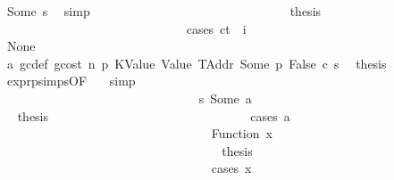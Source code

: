 \begin{isabellebody}
\ Some\ s{}\ \isamarkupfalse%
\ simp\isanewline
\ \ \ \ \ \ \ \ \ \ \ \ \ \ \ \ \ \ \ \ \ \ \ \ \ \ \ \ \isamarkupfalse%
\ \isamarkupfalse%
\ {\isacharquery}{\kern0pt}thesis\isanewline
\ \ \ \ \ \ \ \ \ \ \ \ \ \ \ \ \ \ \ \ \ \ \ \ \ \ \ \ \isamarkupfalse%
\ {\isacharparenleft}{\kern0pt}cases\ {\isachardoublequoteopen}ct\ {\isachardollar}{\kern0pt}{\isachardollar}{\kern0pt}\ i{\isachardoublequoteclose}{\isacharparenright}{\kern0pt}\isanewline
\ \ \ \ \ \ \ \ \ \ \ \ \ \ \ \ \ \ \ \ \ \ \ \ \ \ \ \ \ \ \isamarkupfalse%
\ None\isanewline
\ \ \ \ \ \ \ \ \ \ \ \ \ \ \ \ \ \ \ \ \ \ \ \ \ \ \ \ \ \ \isamarkupfalse%
\ a{}\ gc{\isacharunderscore}{\kern0pt}def\ gcost\ n\ p{}\ KValue\ Value\ TAddr\ Some\ p{}\ False\ c\ s{}\ \isamarkupfalse%
\ {\isacharquery}{\kern0pt}thesis\ \isamarkupfalse%
\ expr{\isachardot}{\kern0pt}psimps{\isacharparenleft}{\kern0pt}{}{}{\isacharparenright}{\kern0pt}{\isacharbrackleft}{\kern0pt}OF\ {}{}{\isacharparenleft}{\kern0pt}{}{\isacharparenright}{\kern0pt}{\isacharbrackright}{\kern0pt}\ \isamarkupfalse%
\ simp\isanewline
\ \ \ \ \ \ \ \ \ \ \ \ \ \ \ \ \ \ \ \ \ \ \ \ \ \ \ \ \isamarkupfalse%
\isanewline
\ \ \ \ \ \ \ \ \ \ \ \ \ \ \ \ \ \ \ \ \ \ \ \ \ \ \ \ \ \ \isamarkupfalse%
\ s{}{\isacharcolon}{\kern0pt}\ {\isacharparenleft}{\kern0pt}Some\ a{\isacharparenright}{\kern0pt}\isanewline
\ \ \ \ \ \ \ \ \ \ \ \ \ \ \ \ \ \ \ \ \ \ \ \ \ \ \ \ \ \ \isamarkupfalse%
\ \isamarkupfalse%
\ {\isacharquery}{\kern0pt}thesis\isanewline
\ \ \ \ \ \ \ \ \ \ \ \ \ \ \ \ \ \ \ \ \ \ \ \ \ \ \ \ \ \ \isamarkupfalse%
\ {\isacharparenleft}{\kern0pt}cases\ a{\isacharparenright}{\kern0pt}\isanewline
\ \ \ \ \ \ \ \ \ \ \ \ \ \ \ \ \ \ \ \ \ \ \ \ \ \ \ \ \ \ \ \ \isamarkupfalse%
\ {\isacharparenleft}{\kern0pt}Function\ x{}{\isacharparenright}{\kern0pt}\isanewline
\ \ \ \ \ \ \ \ \ \ \ \ \ \ \ \ \ \ \ \ \ \ \ \ \ \ \ \ \ \ \ \ \isamarkupfalse%
\ \isamarkupfalse%
\ {\isacharquery}{\kern0pt}thesis\isanewline
\ \ \ \ \ \ \ \ \ \ \ \ \ \ \ \ \ \ \ \ \ \ \ \ \ \ \ \ \ \ \ \ \isamarkupfalse%
\ {\isacharparenleft}{\kern0pt}cases\ x{}{\isacharparenright}{\kern0pt}\isanewline
\ \ \ \ \ \ \ \ \ \ \ \ \ \ \ \ \ \ \ \ \ \ \ \ \ \ \ \ \ \ \ \ \ \ \isamarkupfalse%

\end{isabellebody}
